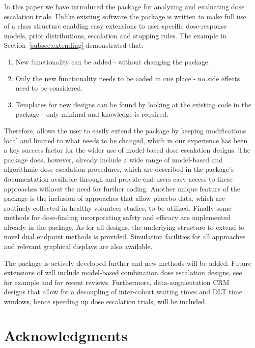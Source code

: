 \documentclass[article]{jss}\usepackage[]{graphicx}\usepackage[]{color}
\begin{document}
In this paper we have introduced the  package  for
analyzing and evaluating dose escalation trials. Unlike existing software the
package is written to make full use of a class structure enabling easy
extensions to user-specific dose-response models, prior distributions,
escalation and stopping rules. The example in Section~\ref{subsec:extending} demonstrated that:
\begin{enumerate}
\item New functionality can be added - without changing the package.
\item Only the new functionality needs to be coded in one place - no side effects
need to be considered.
\item Templates for new designs can be found by looking at the existing
code in the package - only minimal  and  knowledge is required.
\end{enumerate}
Therefore,  allows the user to easily extend the package by keeping modifications local and limited to what needs to be changed, which in our experience has been a key success factor for the wider use of model-based dose escalation designs. 
The package does, however, already include a wide range of model-based and algorithmic dose escalation procedures, which are described in the package's documentation available through
 and provide end-users easy access to these approaches without the need for further coding.
Another unique feature of the package is the inclusion of approaches that allow
placebo data, which are routinely collected in healthy volunteer studies, to be
utilized. Finally some methods \cite[e.g.,][]{bekele2005,yeung2015} for
dose-finding incorporating safety and efficacy are implemented already
in the package. As for all designs, the underlying structure to extend to novel dual endpoint methods is  provided. Simulation facilities for all approaches and relevant
graphical displays are also available.

The package is actively developed further and new methods will be added.
Future extensions of  will include model-based combination dose
escalation designs, see for example \cite{Sweeting2012} and \cite{Riviere2014} 
for recent reviews. Furthermore, data-augmentation CRM designs \citep[see][]{Liu2013} 
that allow for a decoupling of inter-cohort waiting times and DLT time windows, hence
speeding up dose escalation trials, will be included.

\section*{Acknowledgments}
\end{document}
